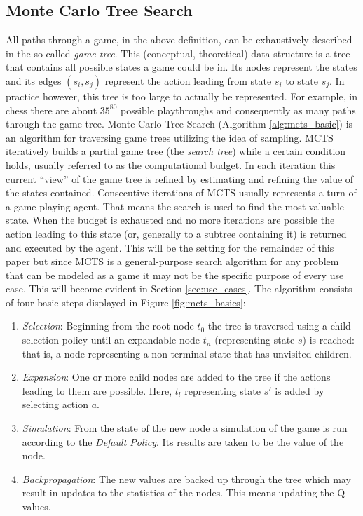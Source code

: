 \subsection{Monte Carlo Tree Search}

All paths through a game, in the above definition, can be exhaustively described in the so-called \textit{game tree}. This (conceptual, theoretical) data structure is a tree that contains all possible states a game could be in. Its nodes represent the states and its edges $(s_i,s_j)$ represent the action leading from state $s_i$ to state $s_j$. In practice however, this tree is too large to actually be represented. For example, in chess there are about $35^{80}$ possible playthroughs and consequently as many paths through the game tree. Monte Carlo Tree Search (Algorithm \ref{alg:mcts_basic}) is an algorithm for traversing game trees utilizing the idea of sampling. MCTS iteratively builds a partial game tree (the \textit{search tree}) while a certain condition holds, usually referred to as the computational budget. In each iteration this current \enquote{view} of the game tree is refined by estimating and refining the value of the states contained. Consecutive iterations of MCTS usually represents a turn of a game-playing agent. That means the search is used to find the most valuable state. When the budget is exhausted and no more iterations are possible the action leading to this state (or, generally to a subtree containing it) is returned and executed by the agent. This will be the setting for the remainder of this paper but since MCTS is a general-purpose search algorithm for any problem that can be modeled as a game it may not be the specific purpose of every use case. This will become evident in Section \ref{sec:use_cases}. The algorithm consists of four basic steps displayed in Figure \ref{fig:mcts_basics}:
\begin{enumerate}[label=\arabic*)]
    \item \textit{Selection}: Beginning from the root node $t_0$ the tree is traversed using a child selection policy until an expandable node $t_n$ (representing state $s$) is reached: that is, a node representing a non-terminal state that has unvisited children.
    \item \textit{Expansion}: One or more child nodes are added to the tree if the actions leading to them are possible. Here, $t_l$ representing state $s'$ is added by selecting action $a$. 
    \item \textit{Simulation}: From the state of the new node a simulation of the game is run according to the \textit{Default Policy}. Its results are taken to be the value of the node.
    \item \textit{Backpropagation}: The new values are backed up through the tree which may result in updates to the statistics of the nodes. This means updating the Q-values.
\end{enumerate}

